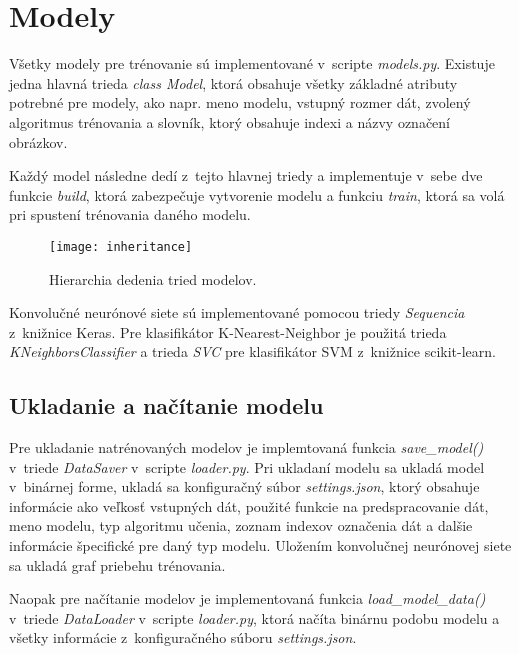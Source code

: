 
\section{Modely}
\label{sec:modely}
Všetky modely pre trénovanie sú implementované v~scripte \textit{models.py}.
Existuje jedna hlavná trieda \textit{class Model}, ktorá obsahuje všetky základné atributy potrebné pre modely, ako napr.
    meno modelu, vstupný rozmer dát, zvolený algoritmus trénovania a slovník, ktorý obsahuje indexi a názvy označení obrázkov.

Každý model následne dedí z~tejto hlavnej triedy a implementuje v~sebe dve funkcie \textit{build}, ktorá zabezpečuje vytvorenie modelu a
    funkciu \textit{train}, ktorá sa volá pri spustení trénovania daného modelu.

\begin{figure}[H]
    \centering
    \texttt{[image: inheritance]}
    \caption{Hierarchia dedenia tried modelov.}
    \label{pic:inheritance}
\end{figure}

Konvolučné neurónové siete sú implementované pomocou triedy \textit{Sequencia} z~knižnice Keras.
Pre klasifikátor K-Nearest-Neighbor je použitá trieda \textit{KNeighborsClassifier} a trieda \textit{SVC} pre klasifikátor SVM z~knižnice scikit-learn.


\subsection{Ukladanie a načítanie modelu}
\label{subsec:ukladaniemodelu}
Pre ukladanie natrénovaných modelov je implemtovaná funkcia \textit{save\_model()} v~triede \textit{DataSaver} v~scripte \textit{loader.py}.
Pri ukladaní modelu sa ukladá model v~binárnej forme, ukladá sa konfiguračný súbor \textit{settings.json}, ktorý obsahuje informácie ako veľkosť
    vstupných dát, použité funkcie na predspracovanie dát, meno modelu, typ algoritmu učenia, zoznam indexov označenia dát a dalšie informácie
    špecifické pre daný typ modelu.
Uložením konvolučnej neurónovej siete sa ukladá graf priebehu trénovania.

Naopak pre načítanie modelov je implementovaná funkcia \textit{load\_model\_data()} v~triede \textit{DataLoader} v~scripte \textit{loader.py},
    ktorá načíta binárnu podobu modelu a všetky informácie z~konfiguračného súboru \textit{settings.json}.

